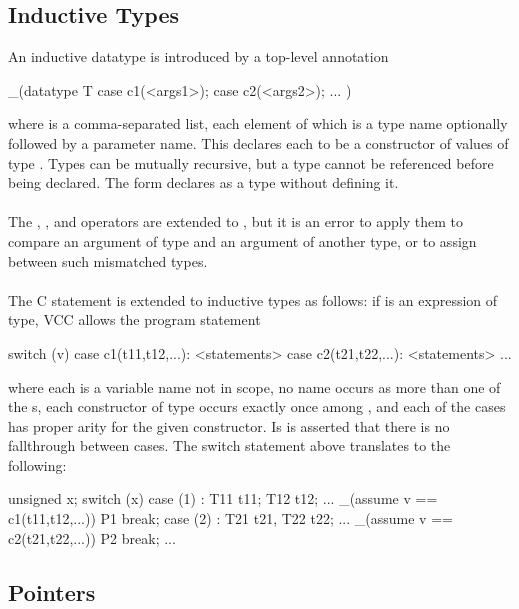\documentclass[preprint,nocopyrightspace]{sigplanconf}
\begin{document}
{{\subsection{Inductive Types}
An inductive datatype is introduced by a top-level annotation
\begin{VCC}
  _(datatype T {
    case c1(<args1>);
    case c2(<args2>);
    ...
  })
\end{VCC}
where  is a comma-separated list, each element of which is
a type name optionally followed by a parameter name. This
declares each  to be a constructor of values of
type . Types can be mutually recursive, but a type cannot be referenced
before being declared. The form  declares  as a
type without defining it.
\\\\
The \vcc{==}, \vcc{!=}, and \vcc{=} operators are extended to , but
it is an error to apply them to compare an argument of type 
and an argument of another type, or to assign between such mismatched types.
\\\\
The C  statement is extended to inductive types as
follows: if  is an expression of type, VCC allows the program statement 
\begin{VCC}
switch (v) {
  case c1(t11,t12,...): <statements>
  case c2(t21,t22,...): <statements>
  ...
}
\end{VCC}
where each  is a variable name not in scope, no name occurs
as more than one of the s, each constructor of type 
occurs exactly once among , and each of the cases has
proper arity for the given constructor. Is is asserted that there is
no fallthrough between cases. The switch statement above translates to
the following:
\begin{VCC}
{
  unsigned x;
  switch (x) {
    case (1) : {
      T11 t11; T12 t12; ...
      _(assume v == c1(t11,t12,...))
      { P1 }
      break;
    } case (2) : {
      T21 t21, T22 t22; ...
      _(assume v == c2(t21,t22,...))
      { P2 }
      break;
    } ...
  }
}
\end{VCC}

\subsection{Pointers}

}}
\end{document}
